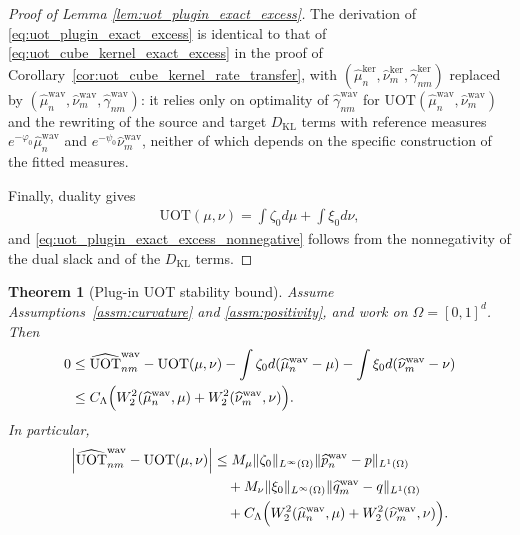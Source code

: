 \documentclass[11pt,reqno]{amsart}
\newtheorem{theorem}{Theorem}
\theoremstyle{definition}
\newcommand{\KL}{\mathrm{KL}}
\renewcommand{\hat}{\widehat}
\begin{document}
\begin{proof}[Proof of Lemma \ref{lem:uot_plugin_exact_excess}]
The derivation of \eqref{eq:uot_plugin_exact_excess} is identical to that of \eqref{eq:uot_cube_kernel_exact_excess} in the proof of Corollary~\ref{cor:uot_cube_kernel_rate_transfer}, with $(\hat\mu_n^{\mathrm{ker}},\hat\nu_m^{\mathrm{ker}},\hat\gamma_{nm}^{\mathrm{ker}})$ replaced by $(\hat\mu_n^{\mathrm{wav}},\hat\nu_m^{\mathrm{wav}},\hat\gamma_{nm}^{\mathrm{wav}})$: it relies only on optimality of $\hat\gamma_{nm}^{\mathrm{wav}}$ for $\mathrm{UOT}(\hat\mu_n^{\mathrm{wav}},\hat\nu_m^{\mathrm{wav}})$ and the rewriting of the source and target $D_\KL$ terms with reference measures $e^{-\varphi_0}\hat\mu_n^{\mathrm{wav}}$ and $e^{-\psi_0}\hat\nu_m^{\mathrm{wav}}$, neither of which depends on the specific construction of the fitted measures.

Finally, duality gives
\begin{align*}
    \mathrm{UOT}(\mu,\nu)
    = \int \zeta_0 d\mu + \int \xi_0 d\nu,
\end{align*}
and \eqref{eq:uot_plugin_exact_excess_nonnegative} follows from the nonnegativity of the dual slack and of the {$D_\KL$ terms}.
\end{proof}

\begin{theorem}[Plug-in UOT stability bound]
\label{thm:uot_plugin_stability_value}
Assume Assumptions~\ref{assm:curvature} and \ref{assm:positivity}, and work on $\Omega=[0,1]^d$.
Then
\begin{equation}
\label{eq:uot_plugin_value_expansion}
\begin{aligned}
0
&\le
\widehat{\mathrm{UOT}}_{nm}^{\mathrm{wav}}
- \mathrm{UOT}(\mu,\nu)
- \int \zeta_0 d(\hat\mu_n^{\mathrm{wav}}-\mu)
- \int \xi_0 d(\hat\nu_m^{\mathrm{wav}}-\nu) \\
&\le
C_\Lambda\Bigl(
W_2^2(\hat\mu_n^{\mathrm{wav}},\mu)
+
W_2^2(\hat\nu_m^{\mathrm{wav}},\nu)
\Bigr).
\end{aligned}
\end{equation}
In particular,
\begin{equation}
\label{eq:uot_plugin_value_absolute}
\begin{aligned}
\left|
\widehat{\mathrm{UOT}}_{nm}^{\mathrm{wav}} - \mathrm{UOT}(\mu,\nu)
\right|
&\le
M_\mu\|\zeta_0\|_{L^\infty(\Omega)}
\|\hat p_n^{\mathrm{wav}}-p\|_{L^1(\Omega)} \\
&\quad+
M_\nu\|\xi_0\|_{L^\infty(\Omega)}
\|\hat q_m^{\mathrm{wav}}-q\|_{L^1(\Omega)} \\
&\quad+
C_\Lambda\Bigl(
W_2^2(\hat\mu_n^{\mathrm{wav}},\mu)
+
W_2^2(\hat\nu_m^{\mathrm{wav}},\nu)
\Bigr).
\end{aligned}
\end{equation}
\end{theorem}
\end{document}
